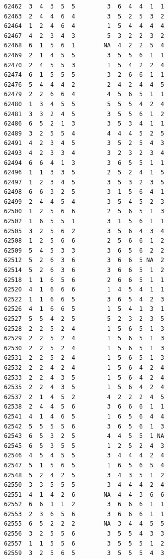 \documentclass[
  letterpaper,
  DIV=11,
  numbers=noendperiod]{scrreprt}
\begin{document}
\begin{verbatim}
62462  3  4  3  5  5         3  6  4  4  1  1
62463  2  4  4  6  4         3  5  2  5  3  2
62464  1  2  4  6  4         1  5  4  4  4  4
62467  4  2  3  4  3         5  3  2  2  3  2
62468  6  1  5  6  1        NA  4  2  2  5  4
62469  2  1  4  5  5         3  5  5  6  1  1
62470  2  4  5  5  3         1  5  4  2  2  4
62474  6  1  5  5  5         3  2  6  6  1  1
62476  5  4  4  4  2         2  4  2  4  4  5
62479  2  2  6  6  4         4  5  6  5  1  1
62480  1  3  4  5  5         5  5  5  4  2  4
62481  3  3  2  4  5         3  5  5  6  1  2
62486  6  5  2  1  3         3  5  3  4  1  1
62489  3  2  5  5  4         4  4  4  5  2  5
62491  4  2  3  4  5         3  5  2  5  4  3
62493  4  2  3  3  4         3  2  3  2  3  4
62494  6  6  4  1  3         3  6  5  5  1  1
62496  1  1  3  3  5         2  5  2  4  1  5
62497  1  2  3  4  5         3  5  3  2  3  5
62498  6  6  3  2  5         3  1  5  6  4  1
62499  2  4  4  5  4         3  5  4  5  2  3
62500  1  2  5  6  6         2  5  6  5  1  3
62502  1  6  5  5  1         3  1  5  6  1  1
62505  3  2  5  6  2         3  5  6  4  3  4
62508  1  2  5  6  6         2  5  6  6  1  2
62509  5  4  5  3  3         3  6  5  6  2  2
62512  5  2  6  3  6         3  6  6  5 NA  2
62514  5  2  6  3  6         3  6  6  5  1  2
62518  1  1  6  5  6         2  6  6  5  1  1
62520  4  1  6  6  6         1  4  5  4  1  1
62522  1  1  6  6  5         3  6  5  4  2  3
62526  4  1  6  6  5         1  5  4  1  3  1
62527  5  5  4  2  5         5  2  3  2  3  5
62528  2  2  5  2  4         1  5  6  5  1  3
62529  2  2  5  2  4         1  5  6  5  1  3
62530  2  2  5  2  4         1  5  6  5  1  3
62531  2  2  5  2  4         1  5  6  5  1  3
62532  2  2  4  2  4         1  5  6  4  2  4
62533  2  2  4  3  5         1  5  6  4  2  4
62535  2  2  4  3  5         1  5  6  4  2  4
62537  2  1  4  5  2         4  2  2  2  4  5
62538  2  4  4  5  6         3  6  6  6  1  1
62541  4  1  4  6  5         1  6  5  6  4  4
62542  5  5  5  5  6         3  6  5  6  1  3
62543  6  5  3  2  5         4  4  5  5  1 NA
62545  6  5  3  5  5         1  2  5  2  4  3
62546  4  5  4  5  5         3  4  4  4  2  4
62547  5  1  5  6  5         1  6  5  6  5  4
62548  5  2  4  2  5         3  4  3  5  1  2
62550  3  3  5  5  5         3  4  4  4  2  4
62551  4  1  4  2  6        NA  4  4  3  6  6
62552  6  6  1  1  2         3  6  6  6  1  1
62553  2  3  6  5  6         3  6  6  6  1  1
62555  6  5  2  2  2        NA  3  4  4  5  5
62556  3  2  5  5  6         3  5  5  4  3  3
62557  1  1  5  5  6         3  5  5  5  1  2
62559  3  2  5  6  5         3  5  5  5  4  3

\end{verbatim}
\end{document}
